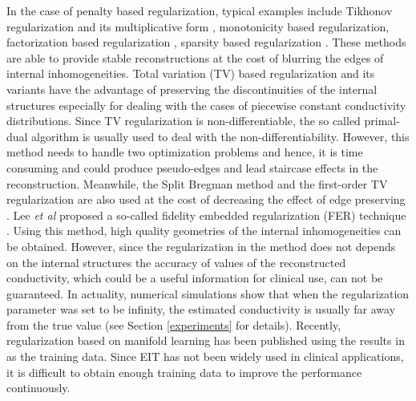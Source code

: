 \documentclass[lettersize,journal]{IEEEtran}
\begin{document}
In the case of penalty based regularization, typical examples include Tikhonov regularization \cite{Cheney1999,Vauhkonen1998} and its multiplicative form \cite{Zhang2019}, monotonicity based regularization\cite{Zhou2018}, factorization based regularization \cite{Choi2014}, sparsity based regularization \cite{Wang2019a,Wang2020,Shi2020}.
These methods are able to provide stable reconstructions at the cost of blurring the edges of internal inhomogeneities.
Total variation (TV) based regularization \cite{Rudin1992,Borsic2010} and its variants \cite{Li2019,Shi2021a,Shi2021b} have the advantage of preserving the discontinuities of the internal structures especially for dealing with the cases of piecewise constant conductivity distributions.
Since TV regularization is non-differentiable, the so called primal-dual algorithm \cite{Borsic2010} is usually used to deal with the non-differentiability. However, this method needs to handle two optimization problems and hence, it is time consuming \cite{Wu2010} and could produce pseudo-edges and lead staircase effects in the reconstruction. Meanwhile, the Split Bregman method and the first-order TV regularization \cite{Jung2015} are also used at the cost of decreasing the effect of edge preserving \cite{Zhou2015}.
Lee {\it et al} proposed a so-called fidelity embedded regularization (FER) technique \cite{Lee2018}. Using this method, high quality geometries of the internal inhomogeneities can be obtained.
However, since the regularization in the method does not depends on the internal structures the accuracy of values of the reconstructed conductivity, which could be a useful information for clinical use, can not be guaranteed. In actuality, numerical simulations show that when the regularization parameter was set to be infinity, the estimated conductivity is usually far away from the true value (see Section \ref{experiments} for details).
Recently, regularization based on manifold learning \cite{Seo2019} has been published using the results in \cite{Lee2018} as the training data.
Since EIT has not been widely used in clinical applications, it is difficult to obtain enough training data to improve the performance continuously.
\end{document}
